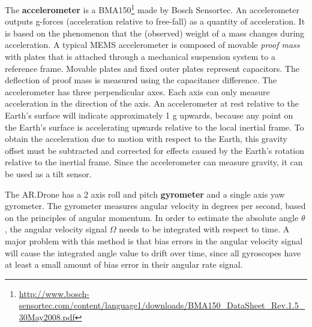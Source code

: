 The \textbf{accelerometer} is a BMA150\footnote{\url{http://www.bosch-sensortec.com/content/language1/downloads/BMA150_DataSheet_Rev.1.5_30May2008.pdf}} made by Bosch Sensortec.
An accelerometer outputs g-forces (acceleration relative to free-fall) as a quantity of acceleration.
It is based on the phenomenon that the (observed) weight of a mass changes during acceleration.
A typical MEMS accelerometer is composed of movable \textit{proof mass} with plates that is attached through a mechanical suspension system to a reference frame.
Movable plates and fixed outer plates represent capacitors. The deflection of proof mass is measured using the capacitance difference.
The accelerometer has three perpendicular axes. Each axis can only measure acceleration in the direction of the axis.
An accelerometer at rest relative to the Earth's surface will indicate approximately 1 g upwards, because any point on the Earth's surface is accelerating upwards relative to the local inertial frame.
To obtain the acceleration due to motion with respect to the Earth, this gravity offset must be subtracted and corrected for effects caused by the Earth's rotation relative to the inertial frame.
Since the accelerometer can measure gravity, it can be used as a tilt sensor.

The AR.Drone has a 2 axis roll and pitch \textbf{gyrometer} and a single axis yaw gyrometer.
The gyrometer measures angular velocity in degrees per second, based on the principles of angular momentum.
In order to estimate the absolute angle $\theta$, the angular velocity signal $\Omega$ needs to be integrated with respect to time.
A major problem with this method is that bias errors in the angular velocity signal will cause the integrated angle value to drift over time, since all gyroscopes have at least a small amount of bias error in their angular rate signal.

